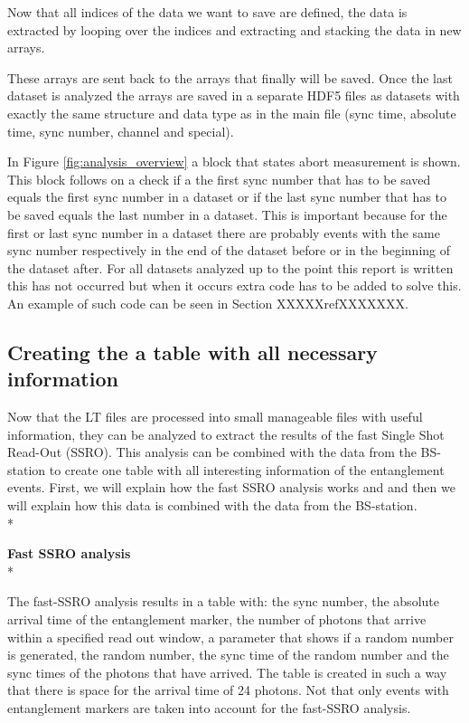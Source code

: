 Now that all indices of the data we want to save are defined, the data is extracted by looping over the indices and extracting and stacking the data in new arrays. 

These arrays are sent back to the arrays that finally will be saved. Once the last dataset is analyzed the arrays are saved in a separate HDF5 files as datasets with exactly the same structure and data type as in the main file (sync time, absolute time, sync number, channel and special).

In Figure \ref{fig:analysis_overview} a block that states abort measurement is shown. This block follows on a check if a the first sync number that has to be saved equals the first sync number in a dataset or if the last sync number that has to be saved equals the last number in a dataset. This is important because for the first or last sync number in a dataset there are probably events with the same sync number respectively in the end of the dataset before or in the beginning of the dataset after. For all datasets analyzed up to the point this report is written this has not occurred but when it occurs extra code has to be added to solve this. An example of such code can be seen in Section XXXXXrefXXXXXXX.

\color{tudelft-cyan}
\subsection{Creating the a table with all necessary information}
\color{black}

Now that the LT files are processed into small manageable files with useful information,  they can be analyzed to extract the results of the fast Single Shot Read-Out (SSRO). This analysis can be combined with the data from the BS-station to create one table with all interesting information of the entanglement events. First, we will explain how the fast SSRO analysis works and and then we will explain how this data is combined with the data from the BS-station. \\*

{\raggedright{\color{tudelft-cyan}\textbf{Fast SSRO analysis}\color{black}\\*}}
The fast-SSRO analysis results in a table with: the sync number, the absolute arrival time of the entanglement marker, the number of photons that arrive within a specified read out window, a parameter that shows if a random number is generated, the random number, the sync time of the random number and the sync times of the photons that have arrived. The table is created in such a way that there is space for the arrival time of 24 photons. Not that only events with entanglement markers are taken into account for the fast-SSRO analysis.

